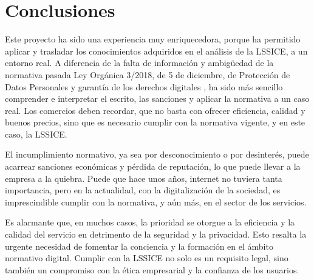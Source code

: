 \part{Conclusiones}
Este proyecto ha sido una experiencia muy enriquecedora, porque ha permitido aplicar y trasladar los conocimientos adquiridos en el análisis de la LSSICE, a un entorno real.
A diferencia de la falta de información y ambigüedad de la normativa pasada Ley Orgánica 3/2018, de 5 de diciembre, de Protección de Datos Personales y garantía de los derechos digitales \cite{LOPDPGDD}, ha sido más sencillo comprender e interpretar el escrito, las sanciones y aplicar la normativa a un caso real.
Los comercios deben recordar, que no basta con ofrecer eficiencia, calidad y buenos precios, sino que es necesario cumplir con la normativa vigente, y en este caso, la LSSICE.

El incumplimiento normativo, ya sea por desconocimiento o por desinterés, puede acarrear sanciones económicas y pérdida de reputación, lo que puede llevar a la empresa a la quiebra.
Puede que hace unos años, internet no tuviera tanta importancia, pero en la actualidad, con la digitalización de la sociedad, es imprescindible cumplir con la normativa, y aún más, en el sector de los servicios.

Es alarmante que, en muchos casos, la prioridad se otorgue a la eficiencia y la calidad del servicio en detrimento de la seguridad y la privacidad. Esto resalta la urgente necesidad de fomentar la conciencia y la formación en el ámbito normativo digital. Cumplir con la LSSICE no solo es un requisito legal, sino también un compromiso con la ética empresarial y la confianza de los usuarios.